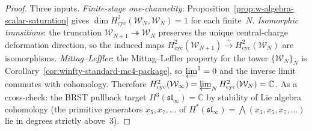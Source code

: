 \begin{proof}
Three inputs.
\emph{Finite-stage one-channelity}:
Proposition~\ref{prop:w-algebra-scalar-saturation} gives
$\dim H^2_{\mathrm{cyc}}(\mathcal{W}_N, \mathcal{W}_N) = 1$
for each finite~$N$.
\emph{Isomorphic transitions}:
the truncation $\mathcal{W}_{N+1} \twoheadrightarrow \mathcal{W}_N$
preserves the unique central-charge deformation direction, so the
induced maps
$H^2_{\mathrm{cyc}}(\mathcal{W}_{N+1})
\xrightarrow{\sim}
H^2_{\mathrm{cyc}}(\mathcal{W}_N)$
are isomorphisms.
\emph{Mittag--Leffler}:
the Mittag--Leffler property for the tower
$\{\mathcal{W}_N\}_N$ is
Corollary~\ref{cor:winfty-standard-mc4-package}, so
$\varprojlim^1 = 0$ and the inverse limit commutes with
cohomology.
Therefore
$H^2_{\mathrm{cyc}}(\mathcal{W}_\infty)
= \varprojlim_N H^2_{\mathrm{cyc}}(\mathcal{W}_N)
= \mathbb{C}$.
As a cross-check: the BRST pullback target
$H^3(\mathfrak{sl}_\infty) = \mathbb{C}$
by stability of Lie algebra cohomology
(the primitive generators $x_5, x_7, \ldots$ of
$H^*(\mathfrak{sl}_\infty)
= \bigwedge(x_3, x_5, x_7, \ldots)$
lie in degrees strictly above~$3$).
\end{proof}

